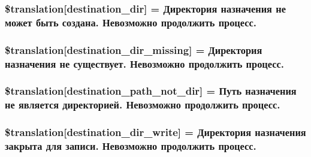 \subsubsection[{\$translation}]{\setlength{\rightskip}{0pt plus 5cm}\$translation\mbox{[}\textquotesingle{}destination\+\_\+dir\textquotesingle{}\mbox{]} = \textquotesingle{}Директория назначения не может быть создана. Невозможно продолжить процесс.\textquotesingle{}}\label{class_8upload_8ru___r_u_8php_aff2427c72a2598aefa6d58df1dd18b08}
\hypertarget{class_8upload_8ru___r_u_8php_a9ef28d3cf09942c6c0a1e77fa09185e8}{}
\subsubsection[{\$translation}]{\setlength{\rightskip}{0pt plus 5cm}\$translation\mbox{[}\textquotesingle{}destination\+\_\+dir\+\_\+missing\textquotesingle{}\mbox{]} = \textquotesingle{}Директория назначения не существует. Невозможно продолжить процесс.\textquotesingle{}}\label{class_8upload_8ru___r_u_8php_a9ef28d3cf09942c6c0a1e77fa09185e8}
\hypertarget{class_8upload_8ru___r_u_8php_a5704a67137126e8c87b7a364175929d4}{}
\subsubsection[{\$translation}]{\setlength{\rightskip}{0pt plus 5cm}\$translation\mbox{[}\textquotesingle{}destination\+\_\+path\+\_\+not\+\_\+dir\textquotesingle{}\mbox{]} = \textquotesingle{}Путь назначения не является директорией. Невозможно продолжить процесс.\textquotesingle{}}\label{class_8upload_8ru___r_u_8php_a5704a67137126e8c87b7a364175929d4}
\hypertarget{class_8upload_8ru___r_u_8php_a97608ea194a616db49141a0e6dee900c}{}
\subsubsection[{\$translation}]{\setlength{\rightskip}{0pt plus 5cm}\$translation\mbox{[}\textquotesingle{}destination\+\_\+dir\+\_\+write\textquotesingle{}\mbox{]} = \textquotesingle{}Директория назначения закрыта для записи. Невозможно продолжить процесс.\textquotesingle{}}\label{class_8upload_8ru___r_u_8php_a97608ea194a616db49141a0e6dee900c}
\hypertarget{class_8upload_8ru___r_u_8php_a40e4e1962226b89fd76da5819a9602b0}{}
